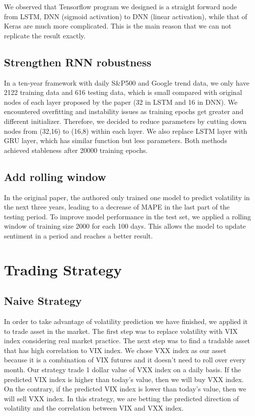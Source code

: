 \documentclass[11pt]{article}
\begin{document}
\vspace{5mm}

We observed that Tensorflow program we designed is a straight forward node from LSTM, DNN (sigmoid activation) to DNN (linear activation), while that of Keras are much more complicated. This is the main reason that we can not replicate the result exactly.


\subsection{Strengthen RNN robustness}

In a ten-year framework with daily S\&P500 and Google trend data, we only have 2122 training data and 616 testing data, which is small compared with original nodes of each layer proposed by the paper (32 in LSTM and 16 in DNN). We encountered overfitting and instability issues as training epochs get greater and different initializer. Therefore, we decided to reduce parameters by cutting down nodes from (32,16) to (16,8) within each layer. We also replace LSTM layer with GRU layer, which has similar function but less parameters. Both methods achieved stableness after 20000 training epochs.

\subsection{Add rolling window}

In the original paper, the authored only trained one model to predict volatility in the next three years, leading to a decrease of MAPE in the last part of the testing period. To improve model performance in the test set, we applied a rolling window of training size 2000 for each 100 days. This allows the model to update sentiment in a period and reaches a better result.

\section{Trading Strategy}

\subsection{Naive Strategy}

In order to take advantage of volatility prediction we have finished, we applied it to trade asset in the market. The first step was to replace volatility with VIX index considering real market practice. The next step was to find a tradable asset that has high correlation to VIX index. We chose VXX index as our asset because it is a combination of VIX futures and it doesn't need to roll over every month. Our strategy trade 1 dollar value of VXX index on a daily basis. If the predicted VIX index is higher than today's value, then we will buy VXX index. On the contrary, if the predicted VIX index is lower than today's value, then we will sell VXX index. In this strategy, we are betting the predicted direction of volatility and the correlation between VIX and VXX index. 
\end{document}
